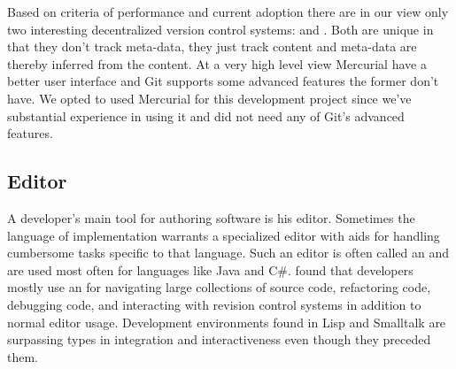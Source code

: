 Based on criteria of performance and current adoption there are in our view
only two interesting decentralized version control systems:
%
and %
. Both are unique in that they don't track meta-data, they just track
content and meta-data are thereby inferred from the content.
At a very high level view Mercurial have a better user interface and Git
supports some advanced features the former don't have. We opted to used
Mercurial for this development project since we've substantial experience in
using it and did not need any of Git's advanced features.

\subsection{Editor}

A developer's main tool for authoring software is his editor. Sometimes the
language of implementation warrants a specialized editor with aids for
handling cumbersome tasks specific to that language. Such an editor is often
called an %
and are used most often for languages like Java and C\#.
\citet{murphy06} found that developers mostly use an  for navigating
large collections of source code, refactoring code, debugging code, and
interacting with revision control systems in addition to normal editor usage.
Development environments found in Lisp%
and Smalltalk%
are surpassing  types in integration and interactiveness even though
they preceded them.

